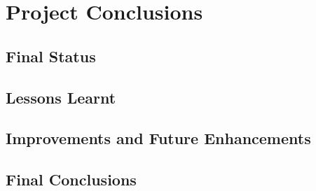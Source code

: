 \chapter{Project Conclusions}

\label{chap:conclusions}

\section{Final Status}

\label{sec:fstat}



\section{Lessons Learnt}



\section{Improvements and Future Enhancements}



\section{Final Conclusions}



